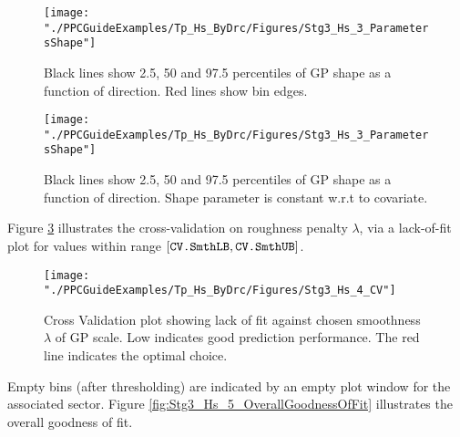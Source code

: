 \begin{figure}
	\centering
	\texttt{[image: "./PPCGuideExamples/Tp\_Hs\_ByDrc/Figures/Stg3\_Hs\_3\_ParametersShape"]}
	\caption{Black lines show  2.5, 50 and 97.5 percentiles of GP shape as a function of direction. Red lines show bin edges.}
	\label{fig:Stg3_Hs_2_ParametersScale}
\end{figure}

\begin{figure}
	\centering
	\texttt{[image: "./PPCGuideExamples/Tp\_Hs\_ByDrc/Figures/Stg3\_Hs\_3\_ParametersShape"]}
	\caption{Black lines show  2.5, 50 and 97.5 percentiles of GP shape as a function of direction. Shape parameter is constant w.r.t to covariate.}
	\label{fig:Stg3_Hs_2_ParametersShape}
\end{figure}

Figure \ref{fig:Stg3_Hs_3_CV} illustrates the cross-validation on roughness penalty $\lambda$, via a lack-of-fit plot for values within range $[\verb|CV.SmthLB|,\verb|CV.SmthUB|]$.
 
\vspace{10pt}
\noindent{}
\vspace{10pt}


\begin{figure}
	\centering
	\texttt{[image: "./PPCGuideExamples/Tp\_Hs\_ByDrc/Figures/Stg3\_Hs\_4\_CV"]}
	\caption{Cross Validation plot showing lack of fit against chosen smoothness $\lambda$ of GP scale. Low indicates good prediction performance. The red line indicates the optimal choice.}
	\label{fig:Stg3_Hs_3_CV}
\end{figure}

\vspace{10pt}
\noindent{}
\vspace{10pt}

Empty bins (after thresholding) are indicated by an empty plot window for the associated sector. Figure \ref{fig:Stg3_Hs_5_OverallGoodnessOfFit} illustrates the overall goodness of fit.

